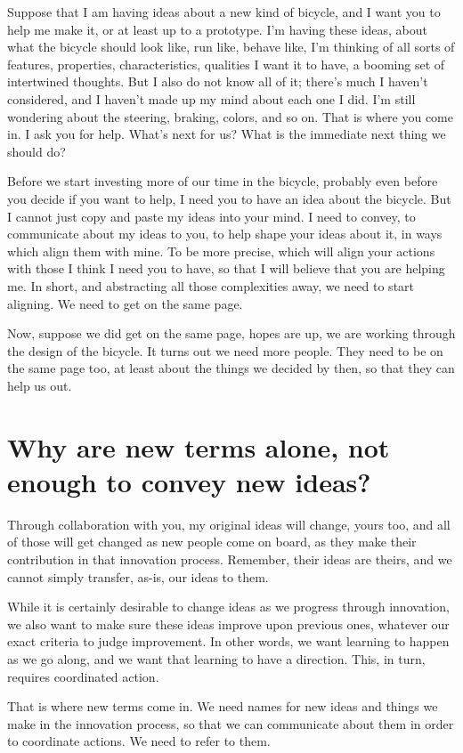 Suppose that I am having ideas about a new kind of bicycle, and I want you to help me make it, or at least up to a prototype. I'm having these ideas, about what the bicycle should look like, run like, behave like, I'm thinking of all sorts of features, properties, characteristics, qualities I want it to have, a booming set of intertwined thoughts. But I also do not know all of it; there's much I haven't considered, and I haven't made up my mind about each one I did. I'm still wondering about the steering, braking, colors, and so on. That is where you come in. I ask you for help. What's next for us? What is the immediate next thing we should do?

Before we start investing more of our time in the bicycle, probably even before you decide if you want to help, I need you to have an idea about the bicycle. But I cannot just copy and paste my ideas into your mind. I need to convey, to communicate about my ideas to you, to help shape your ideas about it, in ways which align them with mine. To be more precise, which will align your actions with those I think I need you to have, so that I will believe that you are helping me. In short, and abstracting all those complexities away, we need to start aligning. We need to get on the same page. 

Now, suppose we did get on the same page, hopes are up, we are working through the design of the bicycle. It turns out we need more people. They need to be on the same page too, at least about the things we decided by then, so that they can help us out.


\section{Why are new terms alone, not enough to convey new ideas?}
\label{c1-s9}
Through collaboration with you, my original ideas will change, yours too, and all of those will get changed as new people come on board, as they make their contribution in that innovation process. Remember, their ideas are theirs, and we cannot simply transfer, as-is, our ideas to them.

While it is certainly desirable to change ideas as we progress through innovation, we also want to make sure these ideas improve upon previous ones, whatever our exact criteria to judge improvement. In other words, we want learning to happen as we go along, and we want that learning to have a direction. This, in turn, requires  coordinated action.

That is where new terms come in. We need names for new ideas and things we make in the innovation process, so that we can communicate about them in order to coordinate actions. We need to refer to them.

